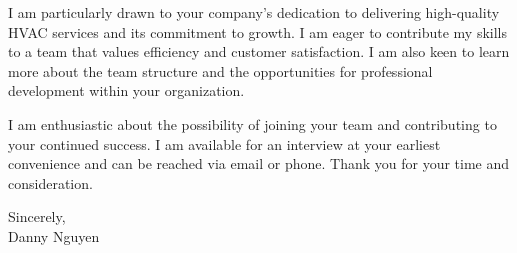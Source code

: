 \documentclass[letterpaper,11pt]{article}
\begin{document}
\vspace{10pt}
I am particularly drawn to your company's dedication to delivering high-quality HVAC services and its commitment to growth. I am eager to contribute my skills to a team that values efficiency and customer satisfaction. I am also keen to learn more about the team structure and the opportunities for professional development within your organization.

\vspace{20pt}
I am enthusiastic about the possibility of joining your team and contributing to your continued success. I am available for an interview at your earliest convenience and can be reached via email or phone. Thank you for your time and consideration.

Sincerely,\\
\vspace{40pt} %
Danny Nguyen

\end{document}
